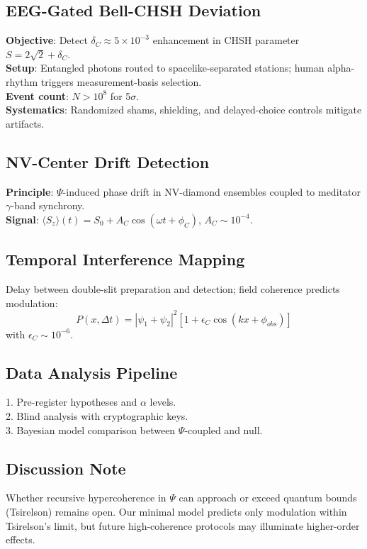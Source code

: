 \documentclass[aps,prx,twocolumn,nofootinbib,superscriptaddress,longbibliography]{revtex4-2}
\begin{document}
\subsection{EEG-Gated Bell-CHSH Deviation}
\textbf{Objective}: Detect $\delta_C \approx 5 \times 10^{-3}$ enhancement in CHSH parameter $S = 2\sqrt2 + \delta_C$. \\
\textbf{Setup}: Entangled photons routed to spacelike-separated stations; human alpha-rhythm triggers measurement-basis selection. \\
\textbf{Event count}: $N > 10^8$ for 5$\sigma$. \\
\textbf{Systematics}: Randomized shams, shielding, and delayed-choice controls mitigate artifacts.

\subsection{NV-Center Drift Detection}
\textbf{Principle}: $\Psi$-induced phase drift in NV-diamond ensembles coupled to meditator $\gamma$-band synchrony. \\
\textbf{Signal}: $\langle S_z\rangle(t) = S_0 + A_C \cos(\omega t + \phi_C)$, $A_C \sim 10^{-4}$.

\subsection{Temporal Interference Mapping}
Delay between double-slit preparation and detection; field coherence predicts modulation:
\begin{equation}
    P(x, \Delta t) = |\psi_1 + \psi_2|^2[1 + \epsilon_C \cos(kx + \phi_{obs})]
\end{equation}
with $\epsilon_C \sim 10^{-6}$.

\subsection{Data Analysis Pipeline}
1. Pre-register hypotheses and $\alpha$ levels.\\
2. Blind analysis with cryptographic keys.\\
3. Bayesian model comparison between $\Psi$-coupled and null.

\subsection{Discussion Note}
Whether recursive hypercoherence in $\Psi$ can approach or exceed quantum bounds (Tsirelson) remains open. Our minimal model predicts only modulation within Tsirelson's limit, but future high-coherence protocols may illuminate higher-order effects.
\end{document}
